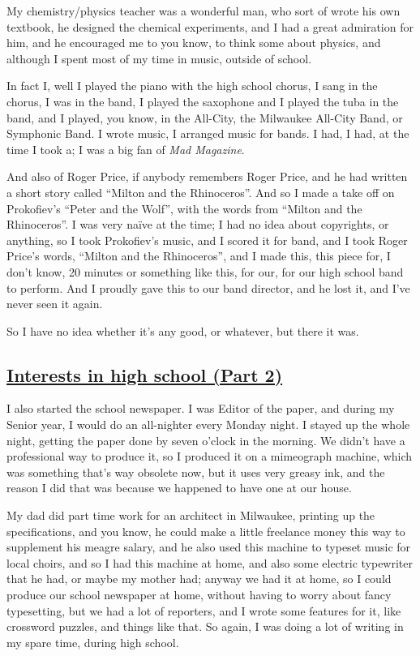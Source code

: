\documentclass[]{article}
\begin{document}
My chemistry/physics teacher was a wonderful man, who sort of wrote his
own textbook, he designed the chemical experiments, and I had a great
admiration for him, and he encouraged me to you know, to think some
about physics, and although I spent most of my time in music, outside of
school.

In fact I, well I played the piano with the high school chorus, I sang
in the chorus, I was in the band, I played the saxophone and I played
the tuba in the band, and I played, you know, in the All-City, the
Milwaukee All-City Band, or Symphonic Band. I wrote music, I arranged
music for bands. I had, I had, at the time I took a; I was a big fan of
\emph{Mad Magazine}.

And also of Roger Price, if anybody remembers Roger Price, and he had
written a short story called ``Milton and the Rhinoceros''. And so I
made a take off on Prokofiev's ``Peter and the Wolf'', with the words
from ``Milton and the Rhinoceros''. I was very naïve at the time; I had
no idea about copyrights, or anything, so I took Prokofiev's music, and
I scored it for band, and I took Roger Price's words, ``Milton and the
Rhinoceros'', and I made this, this piece for, I don't know, 20 minutes
or something like this, for our, for our high school band to perform.
And I proudly gave this to our band director, and he lost it, and I've
never seen it again.

So I have no idea whether it's any good, or whatever, but there it was.

\subsection{\texorpdfstring{\href{http://webofstories.com/play/17065}{Interests
in high school (Part
2)}}{Interests in high school (Part 2)}}\label{interests-in-high-school-part-2}

I also started the school newspaper. I was Editor of the paper, and
during my Senior year, I would do an all-nighter every Monday night. I
stayed up the whole night, getting the paper done by seven o'clock in
the morning. We didn't have a professional way to produce it, so I
produced it on a mimeograph machine, which was something that's way
obsolete now, but it uses very greasy ink, and the reason I did that was
because we happened to have one at our house.

My dad did part time work for an architect in Milwaukee, printing up the
specifications, and you know, he could make a little freelance money
this way to supplement his meagre salary, and he also used this machine
to typeset music for local choirs, and so I had this machine at home,
and also some electric typewriter that he had, or maybe my mother had;
anyway we had it at home, so I could produce our school newspaper at
home, without having to worry about fancy typesetting, but we had a lot
of reporters, and I wrote some features for it, like crossword puzzles,
and things like that. So again, I was doing a lot of writing in my spare
time, during high school.
\end{document}
